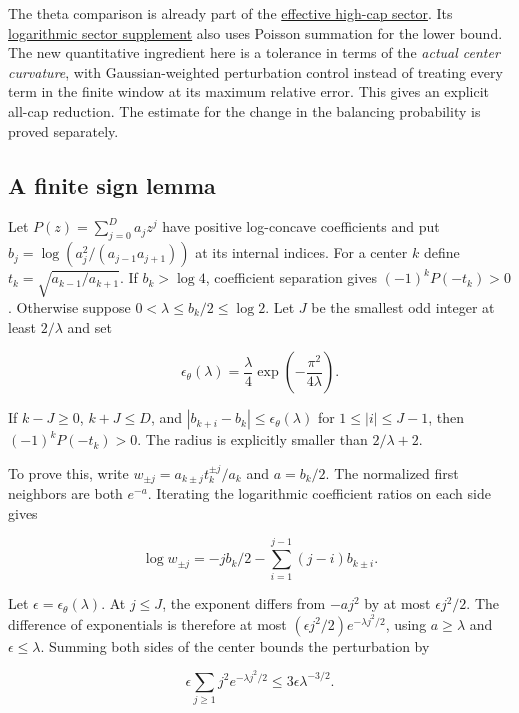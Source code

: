 \documentclass[11pt]{article}
\begin{document}
The theta comparison is already part of the
\href{https://github.com/ProgramComputer/open-math-research/blob/main/topics/balanced-arrays/effective-sectors/sector-proof.md}{effective high-cap sector}.
Its \href{https://github.com/ProgramComputer/open-math-research/blob/main/topics/balanced-arrays/effective-sectors/sector-logarithmic.md}{logarithmic sector supplement}
also uses Poisson summation for the lower bound. The new quantitative
ingredient here is a tolerance in terms of the \emph{actual center curvature},
with Gaussian-weighted perturbation control instead of treating every
term in the finite window at its maximum relative error. This gives an
explicit all-cap reduction. The estimate for the change in the balancing probability is proved separately.

\subsection{A finite sign lemma}

Let $P(z)=\sum_{j=0}^D a_jz^j$ have positive log-concave coefficients and
put $b_j=\log(a_j^2/(a_{j-1}a_{j+1}))$ at its internal indices. For a
center $k$ define $t_k=\sqrt{a_{k-1}/a_{k+1}}$. If $b_k>\log4$,
coefficient separation gives $(-1)^kP(-t_k)>0$. Otherwise suppose
$0<\lambda\le b_k/2\le\log2$. Let $J$ be the smallest odd integer
at least $2/\lambda$ and set

\[
\epsilon_{\theta}(\lambda)=\frac{\lambda}{4}
  \exp\left(-\frac{\pi^2}{4\lambda}\right).
\]

If $k-J\ge0$, $k+J\le D$, and
$|b_{k+i}-b_k|\le\epsilon_{\theta}(\lambda)$ for $1\le |i|\le J-1$,
then $(-1)^kP(-t_k)>0$. The radius is explicitly smaller than
$2/\lambda+2$.

To prove this, write $w_{\pm j}=a_{k\pm j}t_k^{\pm j}/a_k$ and
$a=b_k/2$. The normalized first neighbors are both $e^{-a}$.
Iterating the logarithmic coefficient ratios on each side gives

\[
\log w_{\pm j}=-j b_k/2-\sum_{i=1}^{j-1}(j-i)b_{k\pm i}.
\]

Let $\epsilon=\epsilon_\theta(\lambda)$. At $j\le J$, the exponent differs
from $-a j^2$ by at most $\epsilon j^2/2$. The difference of exponentials
is therefore at most $(\epsilon j^2/2)e^{-\lambda j^2/2}$, using
$a\ge\lambda$ and $\epsilon\le\lambda$. Summing both sides of the
center bounds the perturbation by

\[
\epsilon\sum_{j\ge1}j^2e^{-\lambda j^2/2}
\le 3\epsilon\lambda^{-3/2}.
\]
\end{document}
